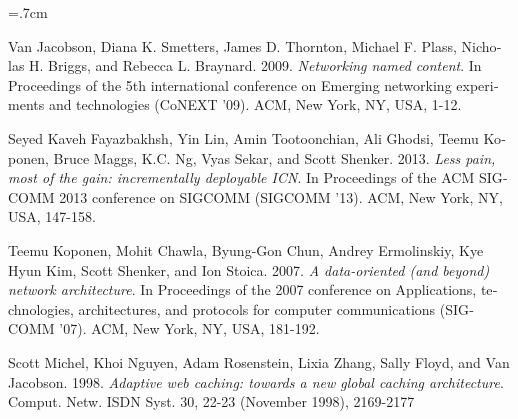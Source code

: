 \renewcommand{\bibname}{مراجع}

\begin{thebibliography}{99}

\begin{latin}

\baselineskip=.7cm

Van Jacobson, Diana K. Smetters, James D. Thornton, Michael F. Plass, Nicholas H. Briggs, and Rebecca L. Braynard. 2009. \textit{Networking named content}. In Proceedings of the 5th international conference on Emerging networking experiments and technologies (CoNEXT '09). ACM, New York, NY, USA, 1-12.

Seyed Kaveh Fayazbakhsh, Yin Lin, Amin Tootoonchian, Ali Ghodsi, Teemu Koponen, Bruce Maggs, K.C. Ng, Vyas Sekar, and Scott Shenker. 2013. \textit{Less pain, most of the gain: incrementally deployable ICN}. In Proceedings of the ACM SIGCOMM 2013 conference on SIGCOMM (SIGCOMM '13). ACM, New York, NY, USA, 147-158. 

Teemu Koponen, Mohit Chawla, Byung-Gon Chun, Andrey Ermolinskiy, Kye Hyun Kim, Scott Shenker, and Ion Stoica. 2007. \textit{A data-oriented (and beyond) network architecture}. In Proceedings of the 2007 conference on Applications, technologies, architectures, and protocols for computer communications (SIGCOMM '07). ACM, New York, NY, USA, 181-192. 

Scott Michel, Khoi Nguyen, Adam Rosenstein, Lixia Zhang, Sally Floyd, and Van Jacobson. 1998. \textit{Adaptive web caching: towards a new global caching architecture}. Comput. Netw. ISDN Syst. 30, 22-23 (November 1998), 2169-2177


\end{latin}


\end{thebibliography}